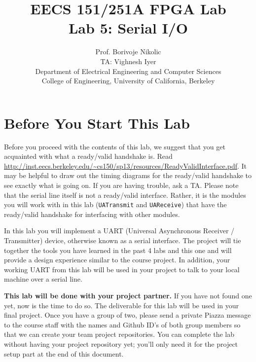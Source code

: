 \documentclass[11pt]{article}
\begin{document}
\title{EECS 151/251A FPGA Lab\\
Lab 5: Serial I/O}

\author{Prof. Borivoje Nikolic \\
TA: Vighnesh Iyer \\Department of Electrical Engineering and Computer Sciences\\
College of Engineering, University of California, Berkeley}
\date{}
\maketitle

\tableofcontents


\section{Before You Start This Lab}

Before you proceed with the contents of this lab, we suggest that you get acquainted with what a ready/valid handshake is. Read \url{http://inst.eecs.berkeley.edu/~cs150/sp13/resources/ReadyValidInterface.pdf}.  It may be helpful to draw out the timing diagrams for the ready/valid handshake to see exactly what is going on. If you are having trouble, ask a TA. Please note that the serial line itself is not a ready/valid interface. Rather, it is the modules you will work with in this lab (\verb|UATransmit| and \verb|UAReceive|) that have the ready/valid handshake for interfacing with other modules.

In this lab you will implement a UART (Universal Asynchronous Receiver / Transmitter) device, otherwise known as a serial interface. The project will tie together the tools you have learned in the past 4 labs and this one and will provide a design experience similar to the course project. In addition, your working UART from this lab will be used in your project to talk to your local machine over a serial line.

\textbf{This lab will be done with your project partner.} If you have not found one yet, now is the time to do so. The deliverable for this lab will be used in your final project. Once you have a group of two, please send a private Piazza message to the course staff with the names and Github ID's of both group members so that we can create your team project repositories. You can complete the lab without having your project repository yet; you'll only need it for the project setup part at the end of this document.
\end{document}
